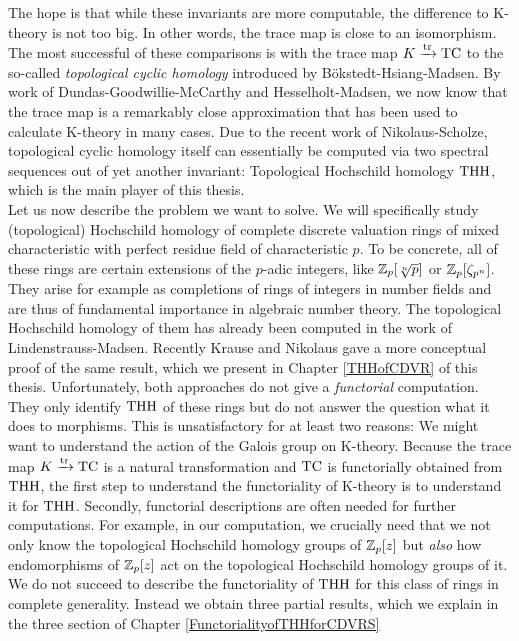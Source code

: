 The hope is that while these invariants are more computable, the difference to K-theory is not too big. In other words, the trace map is close to an isomorphism. 
The most successful of these comparisons is with the trace map $K\xrightarrow{\operatorname{tr}} \operatorname{TC}$ to the so-called \textit{topological cyclic homology} introduced by Bökstedt-Hsiang-Madsen.
By work of Dundas-Goodwillie-McCarthy and Hesselholt-Madsen, we now know that the trace map is a remarkably close approximation that has been used to calculate K-theory in many cases.
Due to the recent work of Nikolaus-Scholze, topological cyclic homology itself can essentially be computed via two spectral sequences out of yet another invariant: Topological Hochschild homology $\operatorname{THH}$, which is the main player of this thesis. \\
Let us now describe the problem we want to solve.
We will specifically study (topological) Hochschild homology of complete discrete valuation rings of mixed characteristic with perfect residue field of characteristic $p$. 
To be concrete, all of these rings are certain extensions of the $p$-adic integers, like $\mathbb{Z}_p[\sqrt[n]{p}]$ or $\mathbb{Z}_p[\zeta_{p^n}]$. They arise for example as completions of rings of integers in number fields and are thus of fundamental importance in algebraic number theory.
The topological Hochschild homology of them has already been computed in the work of Lindenstrauss-Madsen. 
Recently Krause and Nikolaus gave a more conceptual proof of the same result, which we present in Chapter \ref{THHofCDVR} of this thesis. 
Unfortunately, both approaches do not give a \textit{functorial} computation. They only identify $\operatorname{THH}$ of these rings but do not answer the question what it does to morphisms. 
This is unsatisfactory for at least two reasons: We might want to understand the action of the Galois group on K-theory. Because the trace map $K\xrightarrow{\operatorname{tr}}\operatorname{TC}$ is a natural transformation and $\operatorname{TC}$ is functorially obtained from $\operatorname{THH}$, the first step to understand the functoriality of K-theory is to understand it for $\operatorname{THH}$.
Secondly, functorial descriptions are often needed for further computations. For example, in our computation, we crucially need that we not only know the topological Hochschild homology groups of $\mathbb{Z}_p[z]$ but \textit{also} how endomorphisms of $\mathbb{Z}_p[z]$ act on the topological Hochschild homology groups of it. \\
We do not succeed to describe the functoriality of $\operatorname{THH}$ for this class of rings in complete generality. Instead we obtain three partial results, which we explain in the three section of Chapter \ref{FunctorialityofTHHforCDVRS}\\
